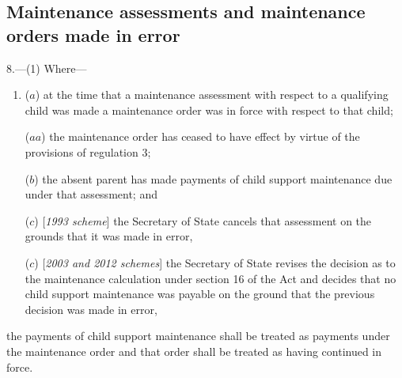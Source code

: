 \documentclass[12pt,a4paper]{article}
\begin{document}
\subsection[8. Maintenance assessments and maintenance orders made in error]{Maintenance assessments and maintenance orders made in error}

8.—(1) Where—
\begin{enumerate}\item[]
($a$) at the time that a maintenance assessment with respect to a qualifying child was made a maintenance order was in force with respect to that child;

($aa$) the maintenance order has ceased to have effect by virtue of the provisions of regulation 3;

($b$) the absent parent has made payments of child support maintenance due under that assessment; and

($c$) [\emph{1993 scheme}]
the Secretary of State  %
cancels that assessment on the grounds that it was made in error,

($c$) [\emph{2003 and 2012 schemes}]
the Secretary of State revises the decision as to the maintenance calculation under section 16 of the Act and decides that no child support maintenance was payable on the ground that the previous decision was made in error,
\end{enumerate}
the payments of child support maintenance shall be treated as payments under the maintenance order and that order shall be treated as having continued in force.
\end{document}
